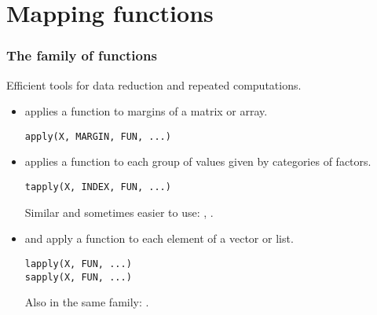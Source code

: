 \section{Mapping functions}

\begin{frame}[fragile]
  \frametitle{The   family of functions}

  Efficient tools for data reduction and repeated computations.

  \begin{itemize}
  \item {} applies a function to margins of a \alert{matrix}
    or \alert{array}.
    \begin{Schunk}
\begin{lstlisting}
apply(X, MARGIN, FUN, ...)
\end{lstlisting}
    \end{Schunk}

  \item {} applies a function to each \alert{group of
      values} given by categories of \alert{factors}.
    \begin{Schunk}
\begin{lstlisting}
tapply(X, INDEX, FUN, ...)
\end{lstlisting}
    \end{Schunk}
    Similar and sometimes easier to use: , .

  \item {} and  apply a function to each
    element of a \alert{vector} or \alert{list}.
    \begin{Schunk}
\begin{lstlisting}
lapply(X, FUN, ...)
sapply(X, FUN, ...)
\end{lstlisting}
    \end{Schunk}
    Also in the same family: .
  \end{itemize}
  \pause
\end{frame}

